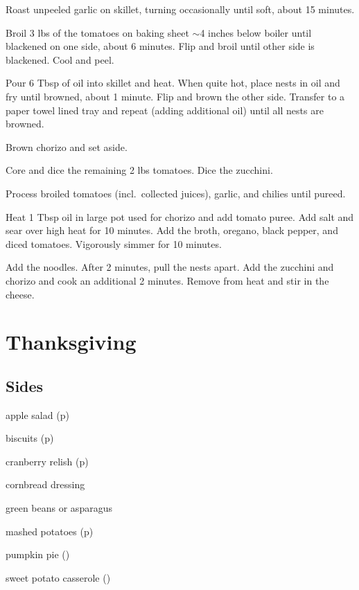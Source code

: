 \documentclass[oneside]{book}  %
\def\thisrecipe{}  %
\newcommand{\recipe}[1]{\section{#1}\def\thisrecipe{: #1}} %
\newcommand{\about}{$\sim$}
\begin{document}
\begin{directions}
  \item Roast unpeeled garlic on skillet, turning occasionally until soft, about
    15 minutes.

  \item Broil 3 lbs of the tomatoes on baking sheet \about 4 inches below boiler
    until blackened on one side, about 6 minutes. Flip and broil until other
    side is blackened. Cool and peel.

  \item Pour 6 Tbsp of oil into skillet and heat. When quite hot, place nests in
    oil and fry until browned, about 1 minute. Flip and brown the other side.
    Transfer to a paper towel lined tray and repeat (adding additional oil)
    until all nests are browned.

  \item Brown chorizo and set aside.

  \item Core and dice the remaining 2 lbs tomatoes. Dice the zucchini.

  \item Process broiled tomatoes (incl.\ collected juices), garlic, and chilies
    until pureed.

  \item Heat 1 Tbsp oil in large pot used for chorizo and add tomato puree. Add
    salt and sear over high heat for 10 minutes. Add the broth, oregano, black
    pepper, and diced tomatoes. Vigorously simmer for 10 minutes.

  \item Add the noodles. After 2 minutes, pull the nests apart. Add the zucchini
    and chorizo and cook an additional 2 minutes. Remove from heat and stir in
    the cheese.
\end{directions}
\recipe{Thanksgiving} \label{recipe:thanksgiving} %

\subsection{Sides}
\begin{twocols} \begin{ingredientslist}
  \item apple salad (p\pageref{recipe:apple_salad})
  \item biscuits (p\pageref{recipe:baking_powder_biscuits})
  \item cranberry relish (p\pageref{recipe:cranberry_relish})
  \item cornbread dressing
  \item green beans or asparagus
  \item mashed potatoes (p\pageref{recipe:mashed_potatoes})
  \item pumpkin pie (\CICookbook[720])
  \item sweet potato casserole (\todo)
\end{ingredientslist} \end{twocols}
\end{document}
